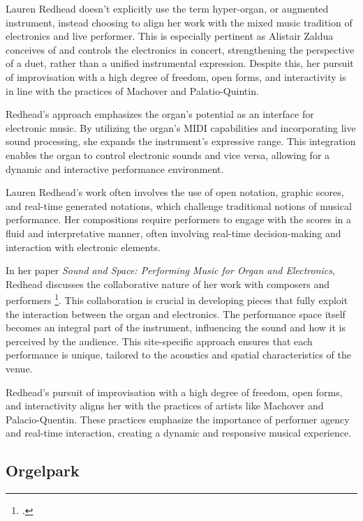 \documentclass[12pt,twoside,maitrise]{dms_ks}
\theoremstyle{definition}
\begin{document}
{Lauren Redhead doesn't explicitly use the term hyper-organ, or augmented instrument, instead choosing to align her work with the mixed music tradition of electronics and live performer. This is especially pertinent as Alistair Zaldua conceives of and controls the electronics in concert, strengthening the perspective of a duet, rather than a unified instrumental expression. Despite this, her pursuit of improvisation with a high degree of freedom, open forms, and interactivity is in line with the practices of Machover and Palatio-Quintin.

Redhead's approach emphasizes the organ's potential as an interface for electronic music. By utilizing the organ’s MIDI capabilities and incorporating live sound processing, she expands the instrument’s expressive range. This integration enables the organ to control electronic sounds and vice versa, allowing for a dynamic and interactive performance environment.

Lauren Redhead’s work often involves the use of open notation, graphic scores, and real-time generated notations, which challenge traditional notions of musical performance. Her compositions require performers to engage with the scores in a fluid and interpretative manner, often involving real-time decision-making and interaction with electronic elements.

In her paper \textit{Sound and Space: Performing Music for Organ and Electronics}, Redhead discusses the collaborative nature of her work with composers and performers \footcite[]{redhead_sound_2014}. This collaboration is crucial in developing pieces that fully exploit the interaction between the organ and electronics. The performance space itself becomes an integral part of the instrument, influencing the sound and how it is perceived by the audience. This site-specific approach ensures that each performance is unique, tailored to the acoustics and spatial characteristics of the venue.

Redhead’s pursuit of improvisation with a high degree of freedom, open forms, and interactivity aligns her with the practices of artists like Machover and Palacio-Quentin. These practices emphasize the importance of performer agency and real-time interaction, creating a dynamic and responsive musical experience.

\subsection{Orgelpark}

}
\end{document}
